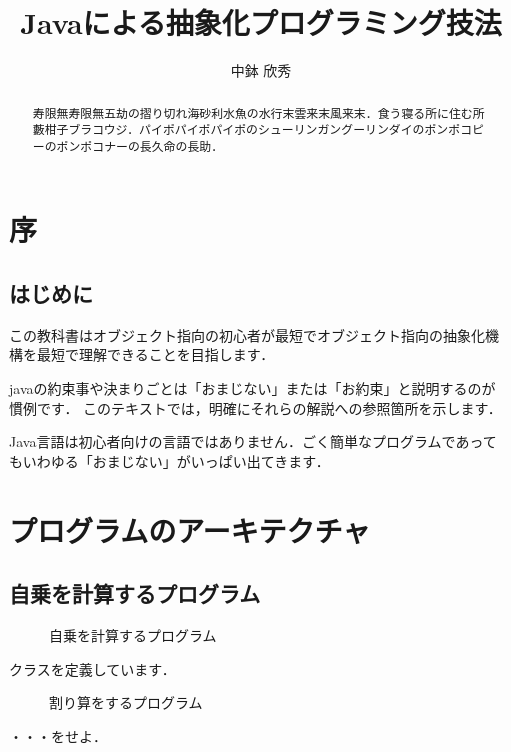 \documentclass[a4j,papersize]{jsbook}
\title{Javaによる抽象化プログラミング技法}
\author{中鉢 欣秀}
\begin{document}
\maketitle

\chapter*{序}
\begin{abstract}
寿限無寿限無五劫の摺り切れ海砂利水魚の水行末雲来末風来末．食う寝る所に住む所藪柑子ブラコウジ．パイポパイポパイポのシューリンガングーリンダイのポンポコピーのポンポコナーの長久命の長助．
\end{abstract}

\section*{はじめに}

この教科書はオブジェクト指向の初心者が最短でオブジェクト指向の抽象化機
構を最短で理解できることを目指します．

javaの約束事や決まりごとは「おまじない」または「お約束」と説明するのが
慣例です．
このテキストでは，明確にそれらの解説への参照箇所を示します．

Java言語は初心者向けの言語ではありません．ごく簡単なプログラムであって
もいわゆる「おまじない」がいっぱい出てきます．

\chapter{プログラムのアーキテクチャ}

\section{自乗を計算するプログラム}
\begin{figure}

\caption{自乗を計算するプログラム} 
\end{figure}

クラスを定義しています．

\begin{figure}

\caption{割り算をするプログラム} 
\end{figure}

\begin{演習}
 ・・・をせよ．
\end{演習}
\end{document}

